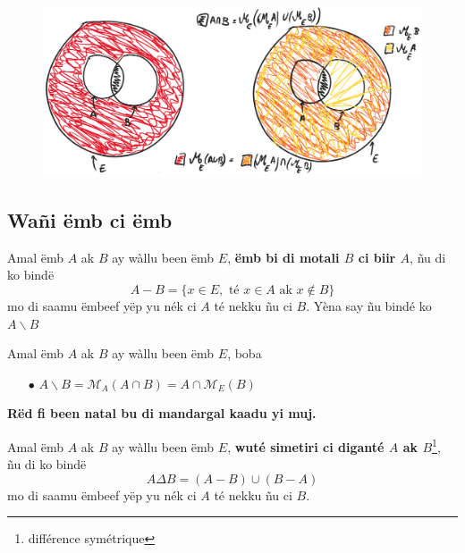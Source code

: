 \documentclass[twoside, a4paper]{article}
\begin{document}
\begin{figure}[ht]
  \centering
  \includegraphics[scale = 0.5]{image/motali_emb_teg.png}
  \label{fig:motali_emb_teg}
\end{figure}

\subsection{Wañi ëmb ci ëmb}
\begin{tcolorbox}[enhanced jigsaw,breakable,pad at break*=1mm, colback=red!5!white,colframe=white!75!black,title= Téeki,watermark color=white]
  Amal ëmb $A$ ak $B$ ay wàllu been ëmb $E$, \textbf{ëmb bi di motali $B$ ci biir $A$}, ñu di ko bindë $$A - B = \big \{x \in E, \text{ té } x \in A \text{ ak } x \not \in B\}$$
  mo di saamu ëmbeef yëp yu nék ci $A$ té nekku ñu ci $B$. Yèna say ñu bindé ko $A \backslash B$
\end{tcolorbox}

\begin{tcolorbox}[enhanced jigsaw,breakable,pad at break*=1mm, colback=orange!5!white,colframe=white!75!black,title= Seetlu,
    watermark color=white]
  Amal ëmb $A$ ak $B$ ay wàllu been ëmb $E$, boba
  \begin{itemize}
    \item[$\bullet$] $A\backslash B = \mathcal{M}_A (A\cap B) = A \cap \mathcal{M}_E (B)$
  \end{itemize}
\end{tcolorbox}
\textbf{Rëd fi been natal bu di mandargal kaadu yi muj.}

\begin{tcolorbox}[enhanced jigsaw,breakable,pad at break*=1mm, colback=red!5!white,colframe=white!75!black,title= Téeki,watermark color=white]
  Amal ëmb $A$ ak $B$ ay wàllu been ëmb $E$, \textbf{wuté simetiri ci diganté $A$ ak $B$}\footnote{différence symétrique
  }, ñu di ko bindë $$A \Delta  B = (A-B) \cup (B-A)$$
  mo di saamu ëmbeef yëp yu nék ci $A$ té nekku ñu ci $B$.
\end{tcolorbox}
\end{document}
